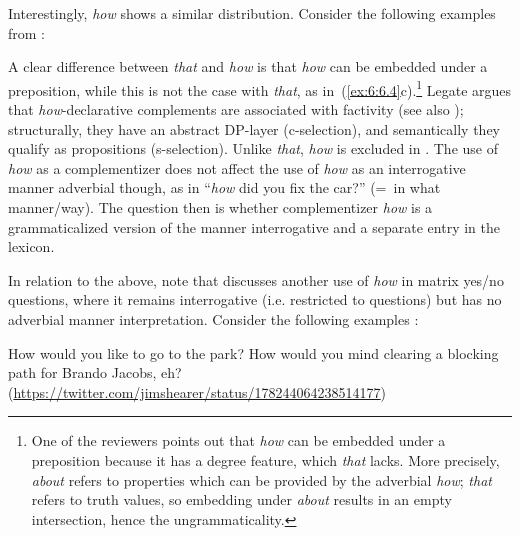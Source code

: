 \documentclass[output=paper]{langsci/langscibook}
\begin{document}
Interestingly,  \emph{how} shows a similar distribution. Consider the
following examples from \citet[122]{Legate2010}:

\ea\label{ex:6:6.4}
	\z
\z

A clear difference between \emph{that} and \emph{how} is that \emph{how}
can be embedded under a preposition, while this is not the case with
\emph{that}, as in~(\ref{ex:6:6.4}c).\footnote{One of the reviewers points out that
\emph{how} can be embedded under a preposition because it has a degree
feature, which \emph{that} lacks. More precisely, \emph{about} refers to
properties which can be provided by the adverbial \emph{how}; \emph{that}
refers to truth values, so embedding under \emph{about} results in an empty
intersection, hence the ungrammaticality.}  Legate argues that
\emph{how}{}-declarative complements are associated with factivity (see also
\citealt{Nye2013}); structurally, they have an abstract DP-layer (c-selection),
and semantically they qualify as propositions (s-selection). Unlike
\emph{that}, \emph{how} is excluded in . The use of
\emph{how} as a complementizer does not affect the use of \emph{how} as an
interrogative manner adverbial though, as in ``\emph{how} did you fix the
car?'' (=~in what manner/way). The question then is whether complementizer
\emph{how} is a grammaticalized version of the manner interrogative and a
separate entry in the lexicon.

In relation to the above, note that \citet{vanGelderen2015} discusses another
use of \emph{how} in matrix yes/no questions, where it remains interrogative
(i.e. restricted to questions) but has no adverbial manner interpretation.
Consider the following examples \parencite[164--165]{vanGelderen2015}:

\ea\label{ex:6:6.5}
	\ea How would you like to go to the park?
	\ex How would you mind clearing a blocking path for Brando Jacobs, eh?
		(\url{https://twitter.com/jimshearer/status/178244064238514177})
	\z
\z
\end{document}
